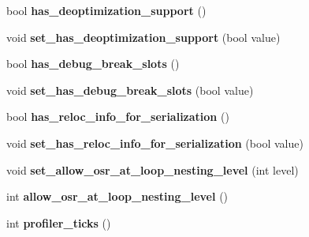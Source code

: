 \begin{DoxyCompactItemize}
\item 
bool {\bfseries has\+\_\+deoptimization\+\_\+support} ()\hypertarget{classv8_1_1internal_1_1_code_af910471a060e0a44761ea7d978fe7d18}{}\label{classv8_1_1internal_1_1_code_af910471a060e0a44761ea7d978fe7d18}

\item 
void {\bfseries set\+\_\+has\+\_\+deoptimization\+\_\+support} (bool value)\hypertarget{classv8_1_1internal_1_1_code_a1b007b91233b6ec9cde3e58fffc8359f}{}\label{classv8_1_1internal_1_1_code_a1b007b91233b6ec9cde3e58fffc8359f}

\item 
bool {\bfseries has\+\_\+debug\+\_\+break\+\_\+slots} ()\hypertarget{classv8_1_1internal_1_1_code_ae050554eef86b81a008a524e74fc4ff5}{}\label{classv8_1_1internal_1_1_code_ae050554eef86b81a008a524e74fc4ff5}

\item 
void {\bfseries set\+\_\+has\+\_\+debug\+\_\+break\+\_\+slots} (bool value)\hypertarget{classv8_1_1internal_1_1_code_a20c64788311647f1dc94c6a82c733835}{}\label{classv8_1_1internal_1_1_code_a20c64788311647f1dc94c6a82c733835}

\item 
bool {\bfseries has\+\_\+reloc\+\_\+info\+\_\+for\+\_\+serialization} ()\hypertarget{classv8_1_1internal_1_1_code_aa8f95a1dc48739d78d4fdb500b223303}{}\label{classv8_1_1internal_1_1_code_aa8f95a1dc48739d78d4fdb500b223303}

\item 
void {\bfseries set\+\_\+has\+\_\+reloc\+\_\+info\+\_\+for\+\_\+serialization} (bool value)\hypertarget{classv8_1_1internal_1_1_code_a09a45744e0bc864a4e80069ccf6cfe86}{}\label{classv8_1_1internal_1_1_code_a09a45744e0bc864a4e80069ccf6cfe86}

\item 
void {\bfseries set\+\_\+allow\+\_\+osr\+\_\+at\+\_\+loop\+\_\+nesting\+\_\+level} (int level)\hypertarget{classv8_1_1internal_1_1_code_a083beb6172cea8e743f3c04fae6dfeb9}{}\label{classv8_1_1internal_1_1_code_a083beb6172cea8e743f3c04fae6dfeb9}

\item 
int {\bfseries allow\+\_\+osr\+\_\+at\+\_\+loop\+\_\+nesting\+\_\+level} ()\hypertarget{classv8_1_1internal_1_1_code_a3d72d19d658d733c078932e5f659f6e2}{}\label{classv8_1_1internal_1_1_code_a3d72d19d658d733c078932e5f659f6e2}

\item 
int {\bfseries profiler\+\_\+ticks} ()\hypertarget{classv8_1_1internal_1_1_code_a858f3bf9bba2ec680e6f558b586c72b0}{}\label{classv8_1_1internal_1_1_code_a858f3bf9bba2ec680e6f558b586c72b0}


\end{DoxyCompactItemize}
